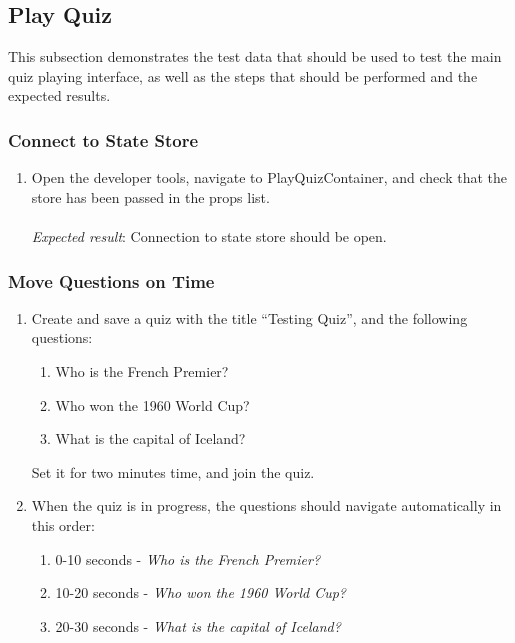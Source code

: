 \subsection{Play Quiz} %
\label{sub:play_quiz_testing}
This subsection demonstrates the test data that should be used to test the main quiz playing interface, as well as the steps that should be performed and the expected results.

\subsubsection{Connect to State Store} %
\label{ssub:connect_to_state_store}
\begin{enumerate}[leftmargin=*]
\item Open the developer tools, navigate to PlayQuizContainer, and check that the store has been passed in the props list.\\\\
\textit{Expected result}: Connection to state store should be open.
\end{enumerate}

\subsubsection{Move Questions on Time} %
\label{ssub:move_questions_on_time}
\begin{enumerate}[leftmargin=*]
\item Create and save a quiz with the title ``Testing Quiz'', and the following questions:
\begin{enumerate}
\item Who is the French Premier?
\item Who won the 1960 World Cup?
\item What is the capital of Iceland?
\end{enumerate}
Set it for two minutes time, and join the quiz.
\item When the quiz is in progress, the questions should navigate automatically in this order:
\begin{enumerate}
\item 0-10 seconds - \textit{Who is the French Premier?}
\item 10-20 seconds - \textit{Who won the 1960 World Cup?}
\item 20-30 seconds - \textit{What is the capital of Iceland?}
\end{enumerate}
\end{enumerate}


